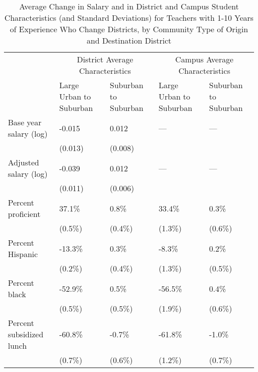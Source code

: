 \documentclass[]{article}
\begin{document}
\begin{table}[ht]
\centering
\begin{tabular}{lp{}p{}p{}p{}}
  \hline
 & \multicolumn{2}{c}{District Average Characteristics} & \multicolumn{2}{c}{Campus Average Characteristics}\\ \cline{2-5}
 & Large Urban to Suburban & Suburban to Suburban & Large Urban to Suburban & Suburban to Suburban \\
  \hline
Base year salary (log) & -0.015 & 0.012 & --- & --- \\ 
   & (0.013) & (0.008) &  &  \\ 
  Adjusted salary (log) & -0.039 & 0.012 & --- & --- \\ 
   & (0.011) & (0.006) &  &  \\ 
  Percent proficient & 37.1\% & 0.8\% & 33.4\% & 0.3\% \\ 
   & (0.5\%) & (0.4\%) & (1.3\%) & (0.6\%) \\ 
  Percent Hispanic & -13.3\% & 0.3\% & -8.3\% & 0.2\% \\ 
   & (0.2\%) & (0.4\%) & (1.3\%) & (0.5\%) \\ 
  Percent black & -52.9\% & 0.5\% & -56.5\% & 0.4\% \\ 
   & (0.5\%) & (0.5\%) & (1.9\%) & (0.6\%) \\ 
  Percent subsidized lunch & -60.8\% & -0.7\% & -61.8\% & -1.0\% \\ 
   & (0.7\%) & (0.6\%) & (1.2\%) & (0.7\%) \\ 
   \hline
\end{tabular}
\caption{Average Change in Salary and in District and Campus Student Characteristics (and Standard Deviations) for Teachers with 1-10 Years of Experience Who Change Districts, by Community Type of Origin and Destination District} 
\label{tbl:change_by_urb}
\end{table}
\end{document}
